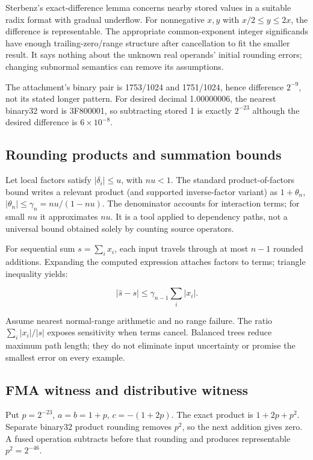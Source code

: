 Sterbenz's exact-difference lemma concerns nearby stored values in a suitable radix format with gradual underflow. For nonnegative \(x,y\) with \(x/2\le y\le2x\), the difference is representable. The appropriate common-exponent integer significands have enough trailing-zero/range structure after cancellation to fit the smaller result. It says nothing about the unknown real operands' initial rounding errors; changing subnormal semantics can remove its assumptions.

The attachment's binary pair is 1753/1024 and 1751/1024, hence difference \(2^{-9}\), not its stated longer pattern. For desired decimal 1.00000006, the nearest binary32 word is 3F800001, so subtracting stored 1 is exactly \(2^{-23}\) although the desired difference is \(6\times10^{-8}\).

\subsection{Rounding products and summation bounds}\label{01-foundations-i-ch011-rounding-products-and-summation-bounds}

Let local factors satisfy \(|\delta_i|\le u\), with \(nu<1\). The standard product-of-factors bound writes a relevant product (and supported inverse-factor variant) as \(1+\theta_n\), \(|\theta_n|\le\gamma_n=nu/(1-nu)\). The denominator accounts for interaction terms; for small \(nu\) it approximates \(nu\). It is a tool applied to dependency paths, not a universal bound obtained solely by counting source operators.

For sequential sum \(s=\sum_i x_i\), each input travels through at most \(n-1\) rounded additions. Expanding the computed expression attaches factors to terms; triangle inequality yields:

\[
|\widehat s-s|\le\gamma_{n-1}\sum_i|x_i|.
\]

Assume nearest normal-range arithmetic and no range failure. The ratio \(\sum_i|x_i|/|s|\) exposes sensitivity when terms cancel. Balanced trees reduce maximum path length; they do not eliminate input uncertainty or promise the smallest error on every example.

\subsection{FMA witness and distributive witness}\label{01-foundations-i-ch011-fma-witness-and-distributive-witness}

Put \(p=2^{-23}\), \(a=b=1+p\), \(c=-(1+2p)\). The exact product is \(1+2p+p^2\). Separate binary32 product rounding removes \(p^2\), so the next addition gives zero. A fused operation subtracts before that rounding and produces representable \(p^2=2^{-46}\).

